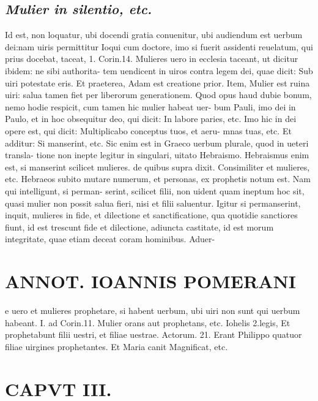 \documentclass{article}
\begin{document}
\begin{pages}
\subsection*{\textit{Mulier in silentio, etc. }}\pstart Id est, non loquatur, ubi docendi gratia conuenitur, ubi audiendum est uerbum dei:nam uiris permittitur Ioqui cum doctore, imo si fuerit assidenti reuelatum, qui prius docebat, taceat, 1. Corin.14. Mulieres uero in ecclesia taceant, ut dicitur ibidem: ne sibi authorita- tem uendicent in uiros contra legem dei, quae dicit: Sub uiri potestate eris. Et praeterea, Adam est creatione prior. Item, Mulier est ruina uiri: salua tamen fiet per liberorum generationem. Quod opus haud dubie bonum, nemo hodie respicit, cum tamen hic mulier habeat uer- bum Pauli, imo dei in Paulo, et in hoc obsequitur deo, qui dicit: In labore paries, etc. Imo hic in dei opere est, qui dicit: Multiplicabo conceptus tuos, et aeru- mnas tuas, etc. Et additur: Si manserint, etc. Sic enim est in Graeco uerbum plurale, quod in ueteri transla- tione non inepte legitur in singulari, uitato Hebraismo. Hebraismus enim est, si manserint scilicet mulieres. de quibus supra dixit. Consimiliter et mulieres, etc. Hebraeos subito mutare numerum, et personas, ex prophetis notum est. Nam qui intelligunt, si perman- serint, scilicet filii, non uident quam ineptum hoc sit, quasi mulier non possit salua fieri, nisi et filii saluentur. Igitur si permanserint, inquit, mulieres in fide, et dilectione et sanctificatione, qua quotidie sanctiores fiunt, id est trescunt fide et dilectione, adiuncta castitate, id est morum integritate, quae etiam deceat coram hominibus. Aduer-  \pend
\section*{ANNOT. IOANNIS POMERANI }\pstart e uero et mulieres prophetare, si habent uerbum, ubi uiri non sunt qui uerbum habeant. I. ad Corin.11. Mulier orans aut prophetans, etc. Iohelis 2.legis, Et prophetabunt filii uestri, et filiae uestrae. Actorum. 21. Erant Philippo quatuor filiae uirgines prophetantes. Et Maria canit Magnificat, etc.  \pend
\endnumbering\beginnumbering\section{CAPVT III.}
{}

\end{pages}
\end{document}
